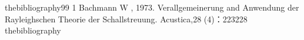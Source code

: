 thebibliography99
1 Bachmann W , 1973.
 Verallgemeinerung and Anwendung der Rayleighschen Theorie der Schallstreuung.
 Acustica,28 (4)：223\PYZhy{}228
thebibliography
